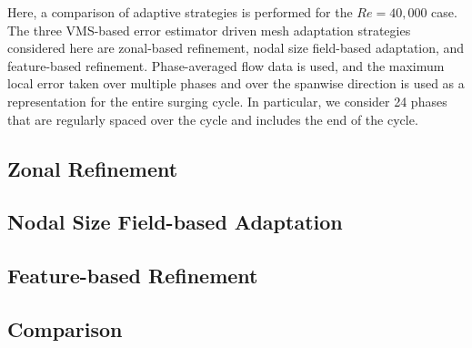 Here, a comparison of adaptive strategies is performed for the $Re=40,000$ case.
The three VMS-based error estimator driven mesh adaptation strategies considered here are zonal-based refinement, nodal size field-based adaptation, and feature-based refinement. Phase-averaged flow data is used, and the maximum local error taken over multiple phases and over the spanwise direction is used as a representation for the entire surging cycle. In particular, we consider 24 phases that are regularly spaced over the cycle and includes the end of the cycle. 

\subsection{Zonal Refinement}


\subsection{Nodal Size Field-based Adaptation}


\subsection{Feature-based Refinement}

\label{sec:feature_based_strat}


\subsection{Comparison}

\label{sec:results_adapt}
